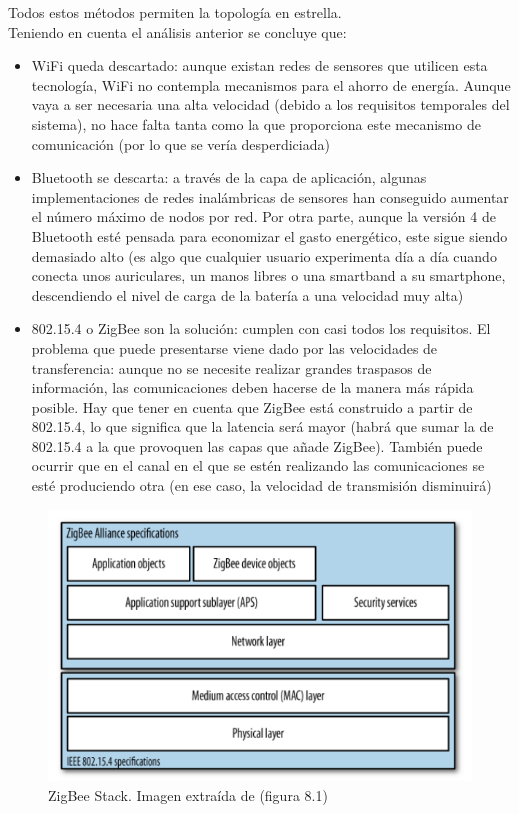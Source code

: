 Todos estos métodos permiten la topología en estrella.\\

Teniendo en cuenta el análisis anterior se concluye que:
\begin{itemize}
  \item WiFi queda descartado: aunque existan redes de sensores que utilicen esta tecnología,
  WiFi no contempla mecanismos para el ahorro de energía. Aunque vaya a ser necesaria una alta velocidad
  (debido a los requisitos temporales del sistema), no hace falta tanta como la que
  proporciona este mecanismo de comunicación (por lo que se vería desperdiciada)
  \item Bluetooth se descarta: a través de la capa de aplicación, algunas implementaciones
  de redes inalámbricas de sensores han conseguido aumentar el número máximo de nodos por red.
  Por otra parte, aunque la versión 4 de Bluetooth esté pensada para economizar el gasto energético,
  este sigue siendo demasiado alto (es algo que cualquier usuario experimenta día a día cuando
  conecta unos auriculares, un manos libres o una smartband a su smartphone, descendiendo el nivel de
  carga de la batería a una velocidad muy alta)
  \item 802.15.4 o ZigBee son la solución: cumplen con casi todos los requisitos.
  El problema que puede presentarse viene dado por las velocidades de transferencia: aunque no
  se necesite realizar grandes traspasos de información, las comunicaciones deben
  hacerse de la manera más rápida posible. Hay que tener en cuenta que ZigBee está construido a partir
  de 802.15.4, lo que significa que la latencia será mayor (habrá que sumar la de 802.15.4 a la que provoquen
  las capas que añade ZigBee). También puede ocurrir que en el canal en el que se estén realizando las comunicaciones
  se esté produciendo otra (en ese caso, la velocidad de transmisión disminuirá)
\end{itemize}

\begin{figure}[htb]
\centering
\includegraphics[width=1\textwidth]{./imagenes/zigbeestack}
\caption{ZigBee Stack. Imagen extraída de \cite{faludi} (figura 8.1) } \label{fig:stackzigbee}
\end{figure}

